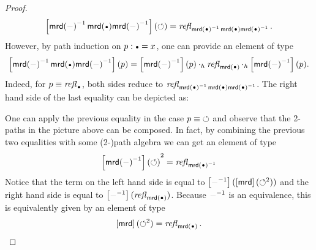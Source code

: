\documentclass[english,a4]{article}
\renewcommand{\ap}[1]{\left[{#1}\right]}
\begin{document}
\begin{proof}
  \begin{displaymath}
    \ap{\inv{\mrd(\blank)} \mrd(\base) \inv{\mrd(\blank)}}(\Sloop) =
    \refl{\inv{\mrd(\base)} \mrd(\base) \inv{\mrd(\base)}}.
  \end{displaymath}
  However, by path induction on $p\from \base = x$, one can provide an
  element of type
  \begin{displaymath}
    \ap{\inv{\mrd(\blank)} \mrd(\base) \inv{\mrd(\blank)}}(p) =
    \ap{\inv{\mrd(\blank)}}(p) \hcomp \refl{\mrd(\base)}
    \hcomp \ap{\inv{\mrd(\blank)}}(p). 
  \end{displaymath}
  Indeed, for $p\jdeq \refl{\base}$, both sides reduce to
  $\refl{\inv{\mrd(\base)} \mrd(\base) \inv{\mrd(\base)}}$.
The right hand side of the last equality can be depicted as:

\begin{center}
\end{center}


One can apply the previous equality in the case $p\equiv \mathord{\circlearrowleft}$ and 
observe that the 2-paths in the picture above can be composed. 
In fact, by combining the previous two equalities 
with some (2-)path algebra we can get an element of type
  \begin{displaymath}
    {\ap{\inv{\mrd(\blank)}}(\Sloop)}^2 = \refl{\inv{\mrd(\base)}}
  \end{displaymath}
  Notice that the term on the left hand side is equal to
  $\ap{\inv{\blank}}(\ap\mrd (\Sloop^2))$ and the right hand side is
  equal to $\ap{\inv{\blank}}(\refl{\mrd(\base)})$. Because
  $\inv{\blank}$ is an equivalence, this is equivalently given by an
  element of type
  \begin{displaymath}
    \ap\mrd(\Sloop^2) = \refl{\mrd(\base)}.
  \end{displaymath}


\end{proof}
\end{document}
